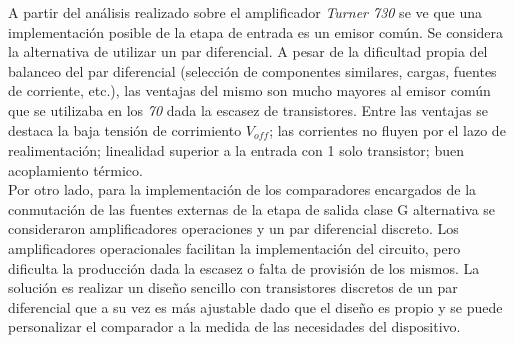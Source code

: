 
	A partir del análisis realizado sobre el amplificador \emph{Turner 730} se ve que una implementación posible de la etapa de entrada es un emisor común. Se considera la alternativa de utilizar un par diferencial. A pesar de la dificultad propia del balanceo del par diferencial (selección de componentes similares, cargas, fuentes de corriente, etc.), las ventajas del mismo son mucho mayores al emisor común que se utilizaba en los \emph{70} dada la escasez de transistores. Entre las ventajas se destaca la baja tensión de corrimiento $V_{\textit{off}}$; las corrientes no fluyen por el lazo de realimentación; linealidad superior a la entrada con 1 solo transistor; buen acoplamiento térmico.\\

	Por otro lado, para la implementación de los comparadores encargados de la conmutación de las fuentes externas de la etapa de salida clase G alternativa se consideraron amplificadores operaciones y un par diferencial discreto. Los amplificadores operacionales facilitan la implementación del circuito, pero dificulta la producción dada la escasez o falta de provisión de los mismos. La solución es realizar un diseño sencillo con transistores discretos de un par diferencial que a su vez es más ajustable dado que el diseño es propio y se puede personalizar el comparador a la medida de las necesidades del dispositivo.\\



